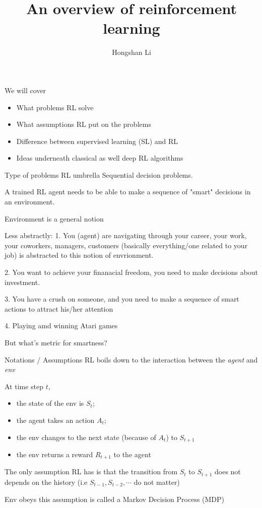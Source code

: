\documentclass{beamer}
\title{An overview of reinforcement learning}
\author{Hongshan Li}
\begin{document}
\begin{frame}{We will cover}
\begin{itemize}
\item What problems RL solve
\item What assumptions RL put on the problems
\item Difference between supervised learning (SL) and RL
\item Ideas underneath classical as well deep RL algorithms
\end{itemize}
\end{frame}

\begin{frame}{Type of problems RL umbrella}
Sequential decision problems.

A trained RL agent needs to be able to make a 
sequence of "smart" decisions in an environment.

Environment is a general notion

Less abstractly: 
1. You (agent) are navigating through your career, your work, your coworkers, managers, customers (basically everything/one related to your job) is abstracted
to this notion of envrionment.

2. You  want to achieve your finanacial freedom, you need to make decisions
about investment. 

3. You have a crush on someone, and you need to make a sequence of smart actions to 
attract his/her attention

4. Playing amd winning Atari games

But what's metric for smartness?
\end{frame}

\begin{frame}{Notations / Assumptions}
RL boils down to the interaction between the \emph{agent} and \emph{env}

At time step $t$, 
\begin{itemize}
\item the state of the env is $S_t$; 
\item the agent takes an action $A_t$;
\item the env changes to the next state (because of $A_t$) to $S_{t+1}$
\item the env returns a reward $R_{t+1}$ to the agent
\end{itemize}

The only assumption RL has is that the transition from 
$S_t$ to $S_{t+1}$ does not depends on the history (i.e
$S_{t-1}, S_{t-2},\cdots$ do not matter)

Env obeys this assumption is called a Markov Decision Process (MDP)
\end{frame}

\end{document}
